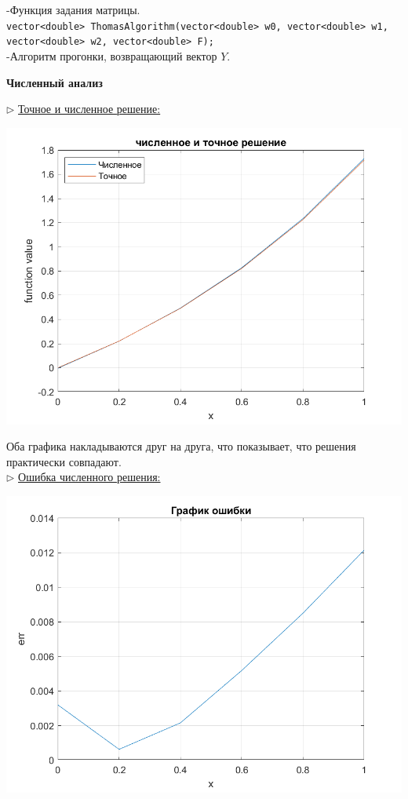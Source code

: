 \documentclass{article}
\begin{document}
	-Функция задания матрицы.\\
	\verb|vector<double> ThomasAlgorithm(vector<double> w0, vector<double> w1,|\\ \verb|vector<double> w2, vector<double> F);|\\
	-Алгоритм прогонки, возвращающий вектор $Y$.
	\begin{center} \textbf{Численный анализ}\end{center}
	$\triangleright$ \underline{Точное и численное решение:}\
	\begin{center} \includegraphics[scale = 0.6]{решения} \end{center}
	Оба графика накладываются друг на друга, что показывает, что решения практически совпадают.\\
	$\triangleright$ \underline{Ошибка численного решения:}
	\begin{center} \includegraphics[scale = 0.6]{ошибка} \end{center}
\end{document}
